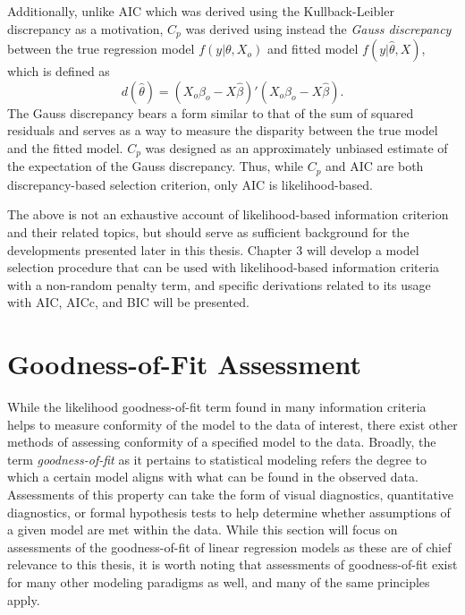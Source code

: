 		Additionally, unlike AIC which was derived using the Kullback-Leibler discrepancy as a motivation, $C_p$ was derived using instead the \textit{Gauss discrepancy} between the true regression model $f(y|\theta, X_o)$ and fitted
		model $f(y|\hat{\theta}, X)$, which is defined as
		\begin{equation}
			d(\hat{\theta}) = (X_o \beta_o - X \hat{\beta})'(X_o \beta_o - X \hat{\beta}) .
		\end{equation}
		The Gauss discrepancy bears a form similar to that of the sum of squared residuals and serves as a way to measure the disparity between the true model and the fitted model. $C_p$ was
		designed as an approximately unbiased estimate of the expectation of the Gauss discrepancy. Thus, while $C_p$ and AIC are both discrepancy-based selection criterion, only AIC is
		likelihood-based.

		The above is not an exhaustive account of likelihood-based information criterion and their related topics, but should serve as sufficient background for the developments presented
		later in this thesis. Chapter 3 will develop a model selection procedure that can be used with likelihood-based information criteria with a non-random penalty term, and specific
		derivations related to its usage with AIC, AICc, and BIC will be presented.
		
		\section{Goodness-of-Fit Assessment}

		While the likelihood goodness-of-fit term found in many information criteria helps to measure conformity of the model to the data of interest, there exist other methods of
		assessing conformity of a specified model to the data. Broadly, the term \textit{goodness-of-fit} as it pertains to statistical modeling refers the degree to which a certain model
		aligns with what can be found in the observed data. Assessments of this property can take the form of visual diagnostics, quantitative diagnostics, or formal hypothesis tests to help
		determine whether assumptions of a given model are met within the data. While this section will focus on assessments of the goodness-of-fit of linear regression models as these are of
		chief relevance to this thesis, it is worth noting that assessments of goodness-of-fit exist for many other modeling paradigms as well, and many of the same principles apply.

